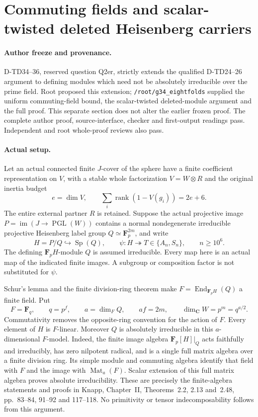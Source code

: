 \section{Commuting fields and scalar-twisted deleted Heisenberg carriers}
\label{sec:heisenberg-commuting-field-carrier}

\paragraph{Author freeze and provenance.}
D-TD34--36, reserved question Q2er, strictly extends the qualified
D-TD24--26 argument to defining modules which need not be absolutely
irreducible over the prime field.  Root proposed this extension;
\texttt{/root/g34\_eightfolds} supplied the uniform commuting-field
bound, the scalar-twisted deleted-module argument and the full proof.
This separate section does not alter the earlier frozen proof.
The complete author proof, source-interface, checker and first-output
readings pass.  Independent and root whole-proof reviews also pass.

\paragraph{Actual setup.}
Let an actual connected finite $J$-cover of the sphere have a finite
coefficient representation on $V$, with a stable whole factorization
$V=W\otimes R$ and the original inertia budget
\[
 e=\dim V,\qquad
 \sum_i\operatorname{rank}(1-V(g_i))=2e+6.
 \tag{HCF.1}
\]
The entire external partner $R$ is retained.  Suppose the actual
projective image $P=\operatorname{im}(J\to\operatorname{PGL}(W))$
contains a normal nondegenerate irreducible projective Heisenberg label group
$Q\simeq\mathbf F_p^{2m}$, and write
\[
 H=P/Q\hookrightarrow\operatorname{Sp}(Q),\qquad
 \psi:H\twoheadrightarrow T\in\{A_n,S_n\},\qquad n\ge10^6.
 \tag{HCF.2}
\]
The defining $\mathbf F_p H$-module $Q$ is assumed irreducible.
Every map here is an actual map of the indicated finite images.
A subgroup or composition factor is not substituted for $\psi$.

Schur's lemma and the finite division-ring theorem make
$F=\operatorname{End}_{\mathbf F_pH}(Q)$ a finite field.
Put
\[
 F=\mathbf F_q,\qquad q=p^f,\qquad
 a=\dim_F Q,\qquad af=2m,\qquad \dim_{\mathbf C}W=p^m=q^{a/2}.
 \tag{HCF.3}
\]
Commutativity removes the opposite-ring convention for the action of
$F$.  Every element of $H$ is $F$-linear.  Moreover $Q$ is absolutely
irreducible in this $a$-dimensional $F$-model.  Indeed, the finite image
algebra $\mathbf F_p[H]|_Q$ acts faithfully and irreducibly, has zero
nilpotent radical, and is a single full matrix algebra over a finite
division ring.  Its simple module and commuting algebra identify that
field with $F$ and the image with $\operatorname{Mat}_a(F)$.
Scalar extension of this full matrix algebra proves absolute
irreducibility.  These are precisely the finite-algebra statements
and proofs in Knapp, Chapter~II, Theorems~2.2, 2.13 and~2.48,
pp.~83--84, 91--92 and 117--118.\cite{TD:Knapp2016}
No primitivity or tensor indecomposability follows from this argument.

